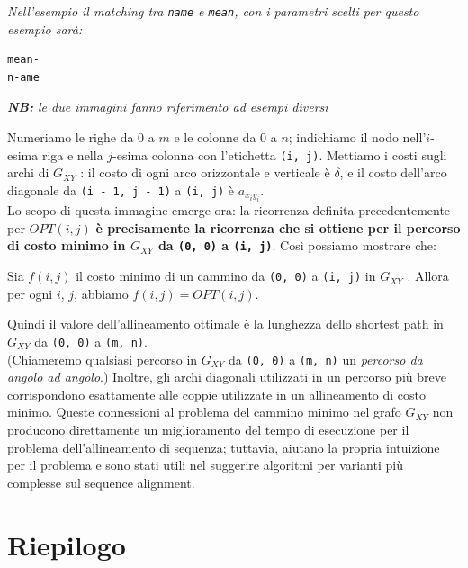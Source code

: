 \emph{Nell'esempio il matching tra \texttt{name} e \texttt{mean}, con i
  parametri scelti per questo esempio sarà:}

\begin{verbatim}
mean-
n-ame
\end{verbatim}

\emph{\textbf{NB:} le due immagini fanno riferimento ad esempi diversi}

Numeriamo le righe da 0 a $m$ e le colonne da 0 a $n$; indichiamo il
nodo nell'$i$-esima riga e nella $j$-esima colonna con l'etichetta
\texttt{(i,\ j)}. Mettiamo i costi sugli archi di $G_{XY}$ : il costo
di ogni arco orizzontale e verticale è $\delta$, e il costo dell'arco
diagonale da \texttt{(i\ -\ 1,\ j\ -\ 1)} a \texttt{(i,\ j)} è
$a_{x_i y_i}$.\\ Lo scopo di questa immagine emerge ora: la ricorrenza
definita precedentemente per $OPT(i, j)$ \textbf{è precisamente la
  ricorrenza che si ottiene per il percorso di costo minimo in $G_{XY}$
  da \texttt{(0,\ 0)} a \texttt{(i,\ j)}}. Così possiamo mostrare che:
\begin{myblockquote}
  Sia $f(i, j)$ il costo minimo di un cammino da
  \texttt{(0,\ 0)} a \texttt{(i,\ j)} in $G_{XY}$ . Allora per ogni
  $i$, $j$, abbiamo $f(i, j) = OPT(i, j)$.
\end{myblockquote}

Quindi il valore dell'allineamento ottimale è la lunghezza dello
shortest path in $G_{XY}$ da \texttt{(0,\ 0)} a \texttt{(m,\ n)}.\\
(Chiameremo qualsiasi percorso in $G_{XY}$ da \texttt{(0,\ 0)} a
\texttt{(m,\ n)} un \emph{percorso da angolo ad angolo}.) Inoltre, gli
archi diagonali utilizzati in un percorso più breve corrispondono
esattamente alle coppie utilizzate in un allineamento di costo minimo.
Queste connessioni al problema del cammino minimo nel grafo $G_{XY}$
non producono direttamente un miglioramento del tempo di esecuzione per
il problema dell'allineamento di sequenza; tuttavia, aiutano la propria
intuizione per il problema e sono stati utili nel suggerire algoritmi
per varianti più complesse sul sequence alignment.

\section{Riepilogo}

